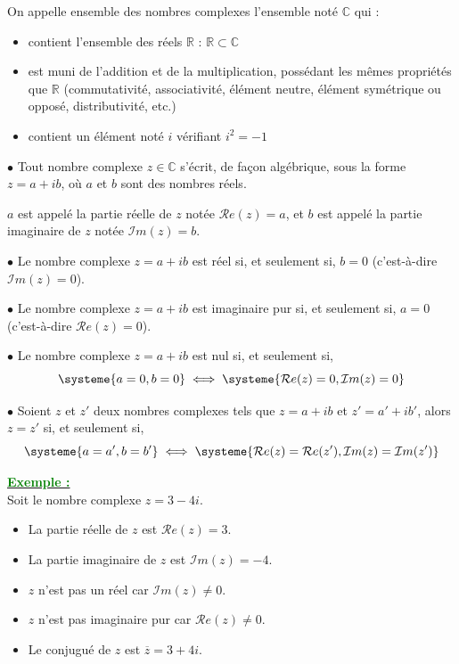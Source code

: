 \documentclass[12pt,a4paper]{article}
\newcounter{exemple} %
\newcommand{\exemple}{%
  \refstepcounter{exemple}%
  \textbf{\textcolor{green}{Exemple \theexemple :}} \ignorespaces
}
\begin{document}
On appelle ensemble des nombres complexes l'ensemble noté $\mathbb{C}$ qui :

\begin{itemize}
  \item[$\blacktriangleright$] contient l'ensemble des réels $\mathbb{R}$ : $\mathbb{R} \subset \mathbb{C}$
  \item[$\blacktriangleright$] est muni de l'addition et de la multiplication, possédant les mêmes propriétés que $\mathbb{R}$ (commutativité, associativité, élément neutre, élément symétrique ou opposé, distributivité, etc.)
  \item[$\blacktriangleright$] contient un élément noté $i$ vérifiant $i^{2}=-1$
\end{itemize}

$\bullet$ Tout nombre complexe $z \in \mathbb{C}$ s'écrit, de façon algébrique, sous la forme $z=a+ib$, où $a$ et $b$ sont des nombres réels. 

$a$ est appelé la partie réelle de $z$ notée $\mathcal{R}e(z)=a$, et $b$ est appelé la partie imaginaire de $z$ notée $\mathcal{I}m(z)=b$.

$\bullet$ Le nombre complexe $z=a+ib$ est réel si, et seulement si, $b=0$ (c'est-à-dire $\mathcal{I}m(z)=0$).

$\bullet$ Le nombre complexe $z=a+ib$ est imaginaire pur si, et seulement si, $a=0$ (c'est-à-dire $\mathcal{R}e(z)=0$).

$\bullet$ Le nombre complexe $z=a+ib$ est nul si, et seulement si,
\[
  \systeme{a=0, b=0}
  \iff
  \systeme{\mathcal{R}e(z)=0, \mathcal{I}m(z)=0}
\]

$\bullet$ Soient $z$ et $z'$ deux nombres complexes tels que $z=a+ib$ et $z'=a'+ib'$, alors $z=z'$ si, et seulement si,
\[
  \systeme{a=a', b=b'}
  \iff
  \systeme{\mathcal{R}e(z)=\mathcal{R}e(z'), \mathcal{I}m(z)=\mathcal{I}m(z')}
\]

\underline{\exemple}\\
Soit le nombre complexe \(z = 3 - 4i\).

\begin{itemize}
  \item[$\bullet$] La partie réelle de \(z\) est \(\mathcal{R}e(z) = 3\).
  \item[$\bullet$] La partie imaginaire de \(z\) est \(\mathcal{I}m(z) = -4\).
  \item[$\bullet$] \(z\) n'est pas un réel car \(\mathcal{I}m(z) \neq 0\).
  \item[$\bullet$] \(z\) n'est pas imaginaire pur car \(\mathcal{R}e(z) \neq 0\).
  \item[$\bullet$] Le conjugué de \(z\) est \(\overline{z} = 3 + 4i\).
\end{itemize}
\end{document}
